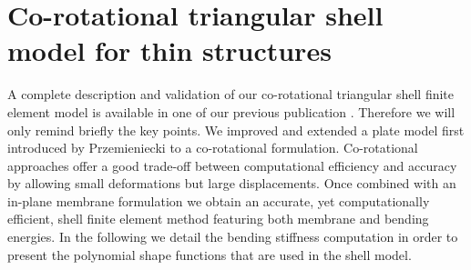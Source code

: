 \documentclass{llncs}
\begin{document}
\section{Co-rotational triangular shell model for thin structures}
\label{sec:model}
%
A complete description and validation of our co-rotational triangular shell finite element model is available in one of our previous publication \cite{Comas10}. Therefore we will only remind briefly the key points. We improved and extended a plate model first introduced by Przemieniecki \cite{Przemieniecki68} to a co-rotational formulation. Co-rotational approaches offer a good trade-off between computational efficiency and accuracy by allowing small deformations but large displacements. Once combined with an in-plane membrane formulation we obtain an accurate, yet computationally efficient, shell finite element method featuring both membrane and bending energies. In the following we detail the bending stiffness computation in order to present the polynomial shape functions that are used in the shell model.



\end{document}
